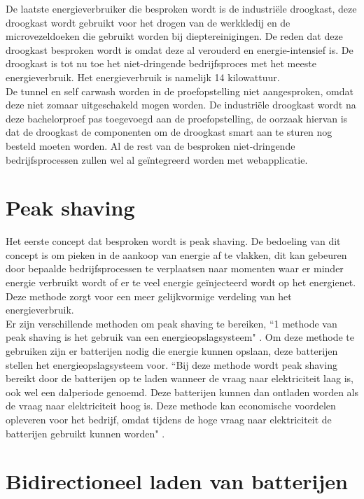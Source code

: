 De laatste energieverbruiker die besproken wordt is de industriële droogkast, deze droogkast wordt gebruikt voor het drogen van de werkkledij en de microvezeldoeken die gebruikt worden bij dieptereinigingen. De reden dat deze droogkast besproken wordt is omdat deze al verouderd en energie-intensief is. De droogkast is tot nu toe het niet-dringende bedrijfsproces met het meeste energieverbruik. Het energieverbruik is namelijk 14 kilowattuur.\\

De tunnel en self carwash worden in de proefopstelling niet aangesproken, omdat deze niet zomaar uitgeschakeld mogen worden. De industriële droogkast wordt na deze bachelorproef pas toegevoegd aan de proefopstelling, de oorzaak hiervan is dat de droogkast de componenten om de droogkast smart aan te sturen nog besteld moeten worden. Al de rest van de besproken niet-dringende bedrijfsprocessen zullen wel al geïntegreerd worden met webapplicatie.

\section{Peak shaving}
\label{sec:stand-van-zaken-peak-shaving}

Het eerste concept dat besproken wordt is peak shaving. De bedoeling van dit concept is om pieken in de aankoop van energie af te vlakken, dit kan gebeuren door bepaalde bedrijfsprocessen te verplaatsen naar momenten waar er minder energie verbruikt wordt of er te veel energie geïnjecteerd wordt op het energienet. Deze methode zorgt voor een meer gelijkvormige verdeling van het energieverbruik.\\

Er zijn verschillende methoden om peak shaving te bereiken, “1 methode van peak shaving is het gebruik van een energieopslagsysteem" \autocite{UDDIN2018}. Om deze methode te gebruiken zijn er batterijen nodig die energie kunnen opslaan, deze batterijen stellen het energieopslagsysteem voor. “Bij deze methode wordt peak shaving bereikt door de batterijen op te laden wanneer de vraag naar elektriciteit laag is, ook wel een dalperiode genoemd. Deze batterijen kunnen dan ontladen worden als de vraag naar elektriciteit hoog is. Deze methode kan economische voordelen opleveren voor het bedrijf, omdat tijdens de hoge vraag naar elektriciteit de batterijen gebruikt kunnen worden" \autocite{UDDIN2018}.

\section{Bidirectioneel laden van batterijen}
\label{sec:stand-van-zaken-bidirectioneel-laden}


